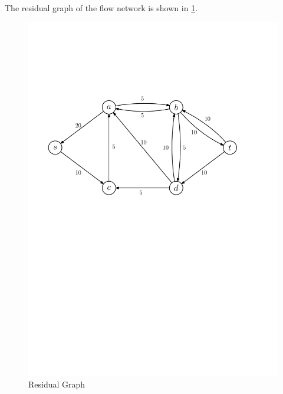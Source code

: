 \documentclass[12pt,letterpaper,titlepage,en-US]{article}
\begin{document}
\begin{homeworkProblem}
    \begin{homeworkSubProblem}

The residual graph of the flow network is shown in \cref{p3a}.
\begin{figure}[H]
    \caption{Residual Graph}\label{p3a}
    \centering
    \includegraphics[width=.7\textwidth]{p3a}
\end{figure}



\end{homeworkSubProblem}
\end{homeworkProblem}
\end{document}
